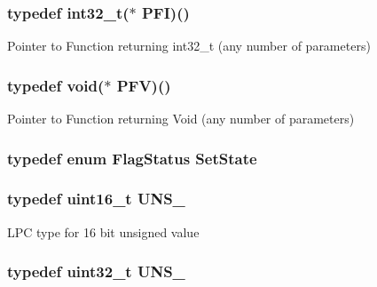 \hypertarget{group__LPC__Types__Public__Types_ga39628beaa6435daa2ae29ba204c920da}{
\subsubsection[{P\-F\-I}]{\setlength{\rightskip}{0pt plus 5cm}typedef int32\-\_\-t($\ast$ P\-F\-I)()}}\label{group__LPC__Types__Public__Types_ga39628beaa6435daa2ae29ba204c920da}
Pointer to Function returning int32\-\_\-t (any number of parameters) \hypertarget{group__LPC__Types__Public__Types_ga2d6ebcfe3babcb204d017c685825a4d8}{
\subsubsection[{P\-F\-V}]{\setlength{\rightskip}{0pt plus 5cm}typedef {\bf void}($\ast$ P\-F\-V)()}}\label{group__LPC__Types__Public__Types_ga2d6ebcfe3babcb204d017c685825a4d8}
Pointer to Function returning Void (any number of parameters) \hypertarget{group__LPC__Types__Public__Types_ga7fab312a9f10f1386a955977d2ec96fe}{
\subsubsection[{Set\-State}]{\setlength{\rightskip}{0pt plus 5cm}typedef  enum {\bf Flag\-Status}  {\bf Set\-State}}}\label{group__LPC__Types__Public__Types_ga7fab312a9f10f1386a955977d2ec96fe}
\hypertarget{group__LPC__Types__Public__Types_gafce87a7f2271b2cf38d7532f157f8a50}{
\subsubsection[{U\-N\-S\-\_\-16}]{\setlength{\rightskip}{0pt plus 5cm}typedef uint16\-\_\-t {\bf U\-N\-S\-\_}}}\label{group__LPC__Types__Public__Types_gafce87a7f2271b2cf38d7532f157f8a50}
L\-P\-C type for 16 bit unsigned value \hypertarget{group__LPC__Types__Public__Types_ga28adf5c6b1811ca447826319598d8aba}{
\subsubsection[{U\-N\-S\-\_\-32}]{\setlength{\rightskip}{0pt plus 5cm}typedef uint32\-\_\-t {\bf U\-N\-S\-\_}}}\label{group__LPC__Types__Public__Types_ga28adf5c6b1811ca447826319598d8aba}
